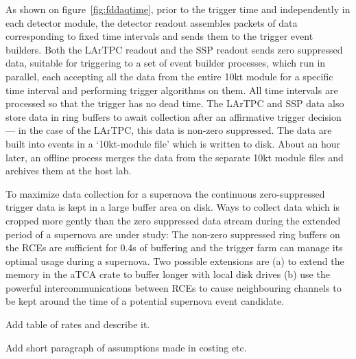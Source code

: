 As shown on figure~\ref{fig:fddaqtime}, prior to the trigger time and
independently in each detector module, the detector readout assembles
packets of data corresponding to fixed time intervals and sends them
to the trigger event builders.  Both the LArTPC readout and the SSP
readout sends zero suppressed data, suitable for triggering to a set
of event builder processes, which run in parallel, each accepting all
the data from the entire 10kt module for a specific time interval and
performing trigger algorithms on them.  All time intervals are
processed so that the trigger has no dead time.  The LArTPC and SSP
data also store data in ring buffers to await collection after an
affirmative trigger decision --- in the case of the LArTPC, this data
is non-zero suppressed.  The data are built into events in a `10kt-module
file' which is written to disk.  About an hour later, an offline process merges
the data from the separate 10kt module files and archives them at the host lab.

To maximize data collection for a supernova the continuous
zero-suppressed trigger data is kept in a large buffer area on disk.
Ways to collect data which is cropped more gently than the zero
suppressed data stream during the extended period of a supernova are
under study: The non-zero suppressed ring buffers on the RCEs are
sufficient for 0.4s of buffering and the trigger farm can manage its optimal
usage during a supernova. Two possible extensions
are (a) to extend the memory in the aTCA crate to buffer longer with
local disk drives (b) use the powerful intercommunications between
RCEs to cause neighbouring channels to be kept around the time of a
potential supernova event candidate. 

 Add table of rates and describe it.

 Add short paragraph of assumptions made in costing etc.

%
%
